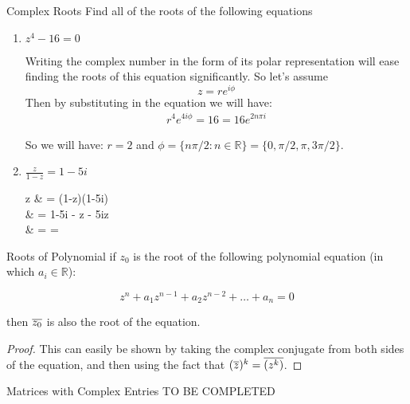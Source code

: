 \begin{example}{Complex Roots}
	Find all of the roots of the following equations
	
	\begin{enumerate}
		\item $z^4 -16 = 0$
		\begin{sol}
			Writing the complex number in the form of its polar representation will ease finding the roots of this equation significantly. So let's assume \[ z = r e^{i\phi} \]
			Then by substituting in the equation we will have:
			\begin{align*}
			r^4 e^{4i\phi} = 16 = 16 e^{2n\pi i}
			\end{align*}
			
			So we will have: $r = 2$ and $\phi = \{ n \pi /2: n \in \mathbb{R} \} = \{ 0, \pi/2, \pi, 3\pi/2 \}$.
		\end{sol}
		\item $\frac{z}{1-z} = 1-5i$
		\begin{sol}
			\begin{flalign*}
				z  & = (1-z)(1-5i) \\
				& = 1-5i - z - 5iz \\
				& =  = 
		\end{flalign*}
		
		\end{sol}
	\end{enumerate}
\end{example}

\begin{propbox}{Roots of Polynomial}
	if $z_0$ is the root of the following polynomial equation (in which $a_i \in \mathbb{R}$):
	
	\[ z^n + a_1 z^{n-1} + a_2 z^{n-2} + \ldots + a_n = 0 \]
	
	then $\overline{z_0}$ is also the root of the equation.

\end{propbox}

\begin{proof}
	This can easily be shown by taking the complex conjugate from both sides of the equation, and then using the fact that $(\overline{z})^k = \overline{(z^k)}$.

\end{proof}


\begin{example}{Matrices with Complex Entries}
	TO BE COMPLETED

\end{example}


